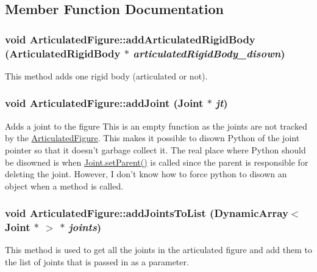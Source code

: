\subsection{Member Function Documentation}
\hypertarget{classCartWheel_1_1Physics_1_1ArticulatedFigure_a7d2ad78571d37e18d899e63a3b09aedd}{
\subsubsection[{addArticulatedRigidBody}]{\setlength{\rightskip}{0pt plus 5cm}void ArticulatedFigure::addArticulatedRigidBody ({\bf ArticulatedRigidBody} $\ast$ {\em articulatedRigidBody\_\-disown})}}
\label{classCartWheel_1_1Physics_1_1ArticulatedFigure_a7d2ad78571d37e18d899e63a3b09aedd}
This method adds one rigid body (articulated or not). \hypertarget{classCartWheel_1_1Physics_1_1ArticulatedFigure_ad2e269f91b3670c3580d2fd6057d74d1}{
\subsubsection[{addJoint}]{\setlength{\rightskip}{0pt plus 5cm}void ArticulatedFigure::addJoint ({\bf Joint} $\ast$ {\em jt})}}
\label{classCartWheel_1_1Physics_1_1ArticulatedFigure_ad2e269f91b3670c3580d2fd6057d74d1}
Adds a joint to the figure This is an empty function as the joints are not tracked by the \hyperlink{classCartWheel_1_1Physics_1_1ArticulatedFigure}{ArticulatedFigure}. This makes it possible to disown Python of the joint pointer so that it doesn't garbage collect it. The real place where Python should be disowned is when \hyperlink{classCartWheel_1_1Physics_1_1Joint_a9aeff3d11d8b0938a916b380860f5f75}{Joint.setParent()} is called since the parent is responsible for deleting the joint. However, I don't know how to force python to disown an object when a method is called. \hypertarget{classCartWheel_1_1Physics_1_1ArticulatedFigure_a5225dc621ca1da0efcf4488e68296cb8}{
\subsubsection[{addJointsToList}]{\setlength{\rightskip}{0pt plus 5cm}void ArticulatedFigure::addJointsToList (DynamicArray$<$ {\bf Joint} $\ast$ $>$ $\ast$ {\em joints})}}
\label{classCartWheel_1_1Physics_1_1ArticulatedFigure_a5225dc621ca1da0efcf4488e68296cb8}
This method is used to get all the joints in the articulated figure and add them to the list of joints that is passed in as a parameter.

